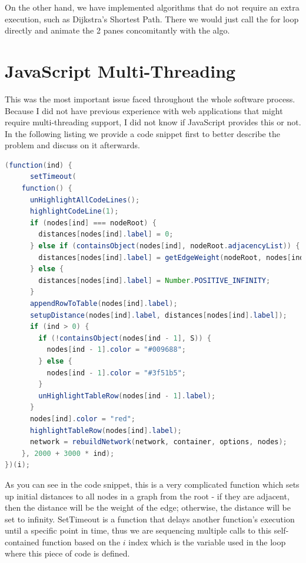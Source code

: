 \documentclass{l4proj}
\begin{document}
On the other hand, we have implemented algorithms that do not require an extra execution, such as Dijkstra's
Shortest Path. There we would just call the for loop directly and animate the 2 panes concomitantly with the algo.

\section{JavaScript Multi-Threading}

This was the most important issue faced throughout the whole software process. Because I did not have previous
experience with web applications that might require multi-threading support, I did not know if JavaScript provides this
or not. In the following listing we provide a code snippet first to better describe the problem and discuss on it afterwards.

\begin{lstlisting}[language=Java, caption=Animation function used in Dijkstra's SP algorithm.]
(function(ind) {
      setTimeout(
	function() {
	  unHighlightAllCodeLines();
	  highlightCodeLine(1);
	  if (nodes[ind] === nodeRoot) {
	    distances[nodes[ind].label] = 0;
	  } else if (containsObject(nodes[ind], nodeRoot.adjacencyList)) {
	    distances[nodes[ind].label] = getEdgeWeight(nodeRoot, nodes[ind]);
	  } else {
	    distances[nodes[ind].label] = Number.POSITIVE_INFINITY;
	  }
	  appendRowToTable(nodes[ind].label);
	  setupDistance(nodes[ind].label, distances[nodes[ind].label]);
	  if (ind > 0) {
	    if (!containsObject(nodes[ind - 1], S)) {
	      nodes[ind - 1].color = "#009688";
	    } else {
	      nodes[ind - 1].color = "#3f51b5";
	    }
	    unHighlightTableRow(nodes[ind - 1].label);
	  }
	  nodes[ind].color = "red";
	  highlightTableRow(nodes[ind].label);
	  network = rebuildNetwork(network, container, options, nodes);
	}, 2000 + 3000 * ind);
})(i);
\end{lstlisting}

As you can see in the code snippet, this is a very complicated function which sets up initial distances to all nodes in a graph from
the root - if they are adjacent, then the distance will be the weight of the edge; otherwise, the distance will be set
to infinity. SetTimeout is a function that delays another function's execution until a specific point in time, thus we are sequencing
multiple calls to this self-contained function based on the $i$ index which is the variable used in the loop where
this piece of code is defined. 
\end{document}
